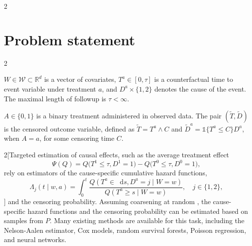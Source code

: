 \documentclass[a0,portrait]{a0poster}
\newcommand*\diff{\mathop{}\!\mathrm{d}}
\newcommand{\R}{\mathbb{R}}
\newcommand{\1}{\mathds{1}}
\begin{document}
\begin{minipage}{\textwidth}
\begin{minipage}[t]{1\linewidth}
\begin{multicols}{2}
\section*{Problem statement}
\vspace{-.2em}
\setlength{\columnseprule}{0pt}
\setlength{\columnsep}{30pt}
\begin{multicols}{2}
  \begin{tcolorbox}[width=\linewidth,colframe=white, title={\center \textbf{Ideal data: \( \bigl(W,
      T^{0}, D^{0}, T^{1}, D^{1}\bigr) \sim Q \)}}, coltitle=black, colbacktitle=white]
  \( W \in \mathcal{W} \subset \R^d \) is a vector of covariates,
  \( T^{a} \in [0, \tau] \) is a counterfactual time to event variable under
  treatment \( a \), and \( D^{a} \times \{1,2\} \) denotes the cause of the
  event. The maximal length of followup is $\tau <\infty$.
\end{tcolorbox}

\begin{tcolorbox}[width=\linewidth,colframe=white, title={\center\textbf{
      Observed data: \( O= \bigl(W,
    A, \tilde T, \tilde D \bigr) \sim P \)}}, coltitle=black,
  colbacktitle=white]
  \( A \in {\{0,1\}} \) is a binary treatment administered in observed
  data. The pair \( (\tilde T, \tilde D) \) is the censored outcome variable,
  defined as \( \tilde T = T^a \wedge C \) and
  \( \tilde D^a = \1{\{T^a \leq C\}} D^a \), when \( A=a \), for some censoring
  time \( C \).
\end{tcolorbox}
\end{multicols}

\begin{multicols}{2}[{Targeted estimation of causal effects, such as the average treatment effect
    \begin{equation*}
      \Psi(Q) = 
      Q{
        \bigl(
          T^{1} \leq \tau, D^{1}=1
        \bigr)}-
      Q{\bigl(
          T^{0} \leq \tau, D^{0}=1
        \bigr)},
    \end{equation*}
    rely on estimators of the cause-specific cumulative hazard functions,
\begin{equation*}
  \Lambda_{j}(t \mid w, a) = \int_0^t\frac{  Q(T^a \in \diff s, D^a=j \mid W=w)}
  {Q(T^a \geq s \mid W=w)},
  \quad j \in \{1,2\},
\end{equation*}\vspace{-1em}}]
and the censoring probability. Assuming coarsening at random
\cite{gill1997coarsening,van2003unified}, the cause-specific hazard functions
and the censoring probability can be estimated based on samples from \( P \).
Many existing methods are available for this task, including the Nelson-Aalen
estimator, Cox models, random survival forests, Poisson regression, and neural
networks. %


\end{multicols}
\end{multicols}
\end{minipage}
\end{minipage}
\end{document}
